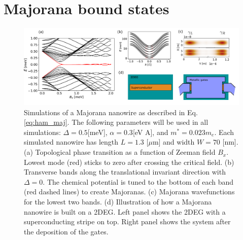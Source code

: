 


\section{Majorana bound states}

\begin{figure}[h!!]
\centering
  \includegraphics[width=0.95\linewidth]{figures/majorana_intro.pdf}
  \caption{Simulations of a Majorana nanowire as described in Eq. \eqref{eq:ham_maj}. The following parameters will be used in all simulations:  $\Delta=0.5$[meV], $\alpha=0.3$[eV A], and $m^*=0.023 m_e$. Each simulated nanowire has length $L=1.3$ [$\mu$m] and width $W=70$ [nm]. (a) Topological phase transition as a function of Zeeman field $B_x$. Lowest mode (red) sticks to zero after crossing the critical field. (b)  Transverse bands along the translational invariant direction with $\Delta=0$. The chemical potential is tuned to the bottom of each band (red dashed lines) to create Majoranas. (c) Majorana wavefunctions for the lowest two bands. (d) Illustration of how a Majorana nanowire is built on a 2DEG. Left panel shows the 2DEG with a superconducting stripe on top. Right panel shows the system after the deposition of the gates.}
  \label{fig:intro}
\end{figure}

